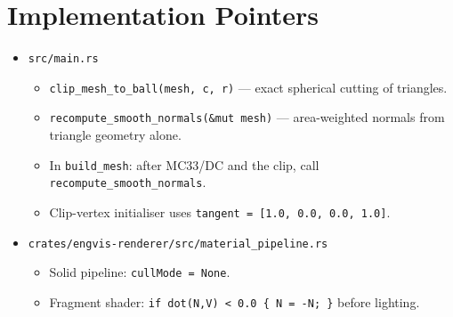 \documentclass[11pt]{article}
\begin{document}
\section{Implementation Pointers}

\begin{itemize}
  \item \texttt{src/main.rs}
        \begin{itemize}
          \item \texttt{clip\_mesh\_to\_ball(mesh, c, r)} --- exact
                spherical cutting of triangles.
          \item \texttt{recompute\_smooth\_normals(\&mut mesh)} ---
                area-weighted normals from triangle geometry alone.
          \item In \texttt{build\_mesh}: after MC33/DC and the clip,
                call \texttt{recompute\_smooth\_normals}.
          \item Clip-vertex initialiser uses
                \texttt{tangent = [1.0, 0.0, 0.0, 1.0]}.
        \end{itemize}
  \item \texttt{crates/engvis-renderer/src/material\_pipeline.rs}
        \begin{itemize}
          \item Solid pipeline: \texttt{cullMode = None}.
          \item Fragment shader: \texttt{if dot(N,V) < 0.0 \{ N = -N; \}}
                before lighting.
        \end{itemize}
\end{itemize}
\end{document}
